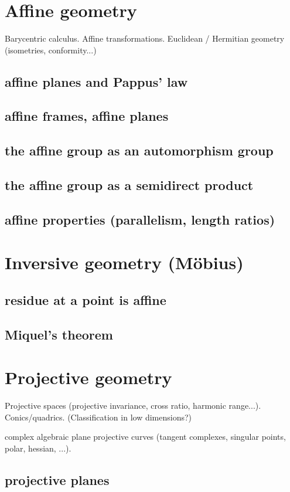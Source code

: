 \section{Affine geometry}
Barycentric calculus. Affine transformations. Euclidean / Hermitian geometry (isometries, conformity...)
\subsection{affine planes and Pappus' law}
\subsection{affine frames, affine planes}
\subsection{the affine group as an automorphism group}
\subsection{the affine group as a semidirect product}
\subsection{affine properties (parallelism, length ratios)}

\section{Inversive geometry (Möbius)}
\subsection{residue at a point is affine}
\subsection{Miquel's theorem}

\section{Projective geometry}
Projective spaces (projective invariance, cross ratio, harmonic range...). Conics/quadrics. (Classification in low dimensions?)
\par
complex algebraic plane projective curves (tangent complexes, singular points, polar, hessian, ...).
\subsection{projective planes}
